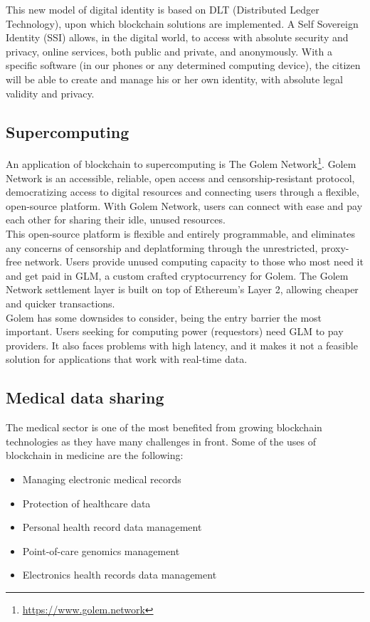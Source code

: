 \documentclass[10pt]{article}
\begin{document}
\begin{multicols}{2}
This new model of digital identity is based on DLT (Distributed Ledger Technology), upon which blockchain solutions are implemented. A Self Sovereign Identity (SSI) allows, in the digital world, to access with absolute security and privacy, online services, both public and private, and anonymously. With a specific software (in our phones or any determined computing device), the citizen will be able to create and manage his or her own identity, with absolute legal validity and privacy.

\subsection{Supercomputing}

An application of blockchain to supercomputing is The Golem Network\footnote{\url{https://www.golem.network}}. Golem Network is an accessible, reliable, open access and censorship-resistant protocol, democratizing access to digital resources and connecting users through a flexible, open-source platform. With Golem Network, users can connect with ease and pay each other for sharing their idle, unused resources.\\

This open-source platform is flexible and entirely programmable, and eliminates any concerns of censorship and deplatforming through the unrestricted, proxy-free network. Users provide unused computing capacity to those who most need it and get paid in GLM, a custom crafted cryptocurrency for Golem. The Golem Network settlement layer is built on top of Ethereum’s Layer 2, allowing cheaper and quicker transactions.\\

Golem has some downsides to consider, being the entry barrier the most important. Users seeking for computing power (requestors) need GLM to pay providers. It also faces problems with high latency, and it makes it not a feasible solution for applications that work with real-time data.

\subsection{Medical data sharing}

The medical sector is one of the most benefited from growing blockchain technologies as they have many challenges in front. Some of the uses of blockchain in medicine are the following:

\begin{itemize}
	\item Managing electronic medical records
	\item Protection of healthcare data
	\item Personal health record data management
	\item Point-of-care genomics management
	\item Electronics health records data management
\end{itemize}


\end{multicols}
\end{document}
